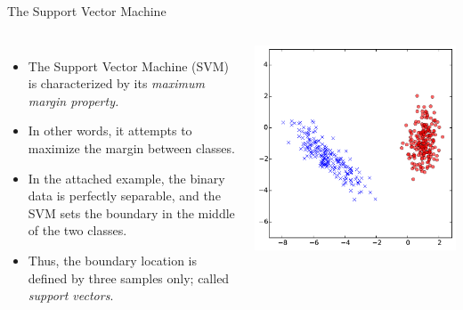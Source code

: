 \documentclass[10pt, aspectratio=169]{beamer} %
\begin{document}
\begin{frame}[fragile,allowframebreaks=0.8]
 {The Support Vector Machine}
\begin{columns}[onlytextwidth]
\begin{itemize}
\item The Support Vector Machine (SVM) is characterized by its \textit{maximum margin property.}
\item In other words, it attempts to maximize the margin between classes.
\item In the attached example, the binary data is perfectly 
separable, and the SVM sets the boundary in the middle of the two classes.
\item Thus, the boundary location is defined by three samples only; called \textit{support vectors}.
\end{itemize}
\includegraphics[width=\columnwidth]{SVM_data.pdf}\\

\end{columns}
\end{frame}
\end{document}
